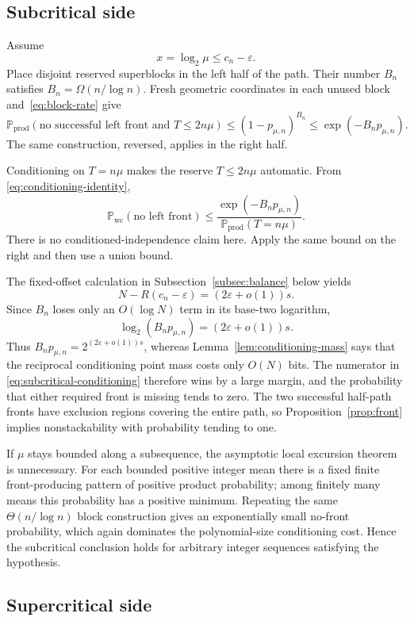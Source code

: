 \documentclass[11pt]{article}
\newcommand{\Prob}{\mathbb P}
\newcommand{\eps}{\varepsilon}
\newcommand{\wc}{\mathrm{wc}}
\newcommand{\prodprob}{\mathrm{prod}}
\begin{document}
\subsection{Subcritical side}

Assume
\[
 x=\log_2\mu\le c_n-\eps.
\]
Place disjoint reserved superblocks in the left half of the path.  Their
number $B_n$ satisfies $B_n=\Omega(n/\log n)$.  Fresh geometric coordinates in
each unused block and~\eqref{eq:block-rate} give
\[
 \Prob_{\prodprob}(\text{no successful left front and }T\le2n\mu)
 \le (1-p_{\mu,n})^{B_n}
 \le \exp(-B_np_{\mu,n}).
 \tag{7.4}\label{eq:no-front}
\]
The same construction, reversed, applies in the right half.

Conditioning on $T=n\mu$ makes the reserve $T\le2n\mu$ automatic.  From
\eqref{eq:conditioning-identity},
\[
 \Prob_{\wc}(\text{no left front})
 \le
 \frac{\exp(-B_np_{\mu,n})}
      {\Prob_{\prodprob}(T=n\mu)}.
 \tag{7.5}\label{eq:subcritical-conditioning}
\]
There is no conditioned-independence claim here.  Apply the same bound on the
right and then use a union bound.

The fixed-offset calculation in Subsection~\ref{subsec:balance} below yields
\[
 N-R(c_n-\eps)=(2\eps+o(1))s.
 \tag{7.6}\label{eq:sub-rate}
\]
Since $B_n$ loses only an $O(\log N)$ term in its base-two logarithm,
\[
 \log_2(B_np_{\mu,n})=(2\eps+o(1))s.
 \tag{7.7}\label{eq:hazard-growth}
\]
Thus $B_np_{\mu,n}=2^{(2\eps+o(1))s}$, whereas
Lemma~\ref{lem:conditioning-mass} says that the reciprocal conditioning point
mass costs only $O(N)$ bits.  The numerator in
\eqref{eq:subcritical-conditioning} therefore wins by a large margin, and the
probability that either required front is missing tends to zero.  The two
successful half-path fronts have exclusion regions covering the entire path,
so Proposition~\ref{prop:front} implies nonstackability with probability
tending to one.

If $\mu$ stays bounded along a subsequence, the asymptotic local excursion
theorem is unnecessary.  For each bounded positive integer mean there is a
fixed finite front-producing pattern of positive product probability; among
finitely many means this probability has a positive minimum.  Repeating the
same $\Theta(n/\log n)$ block construction gives an exponentially small
no-front probability, which again dominates the polynomial-size conditioning
cost.  Hence the subcritical conclusion holds for arbitrary integer sequences
satisfying the hypothesis.

\subsection{Supercritical side}
\end{document}

